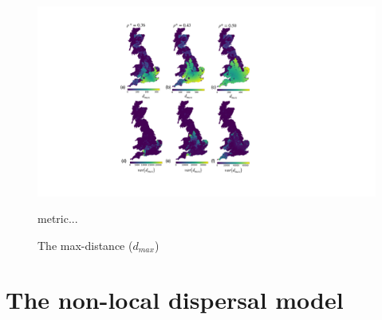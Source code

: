 \begin{figure}
    \centering
    \includegraphics[scale=0.55]{appendix/figures/A-ch4figure1.pdf}
    \caption{The max-distance ($d_{max}$)} metric...
    \label{fig:my_label}
\end{figure}

\blindtext
\blindtext

\chapter{The non-local dispersal model}
\label{section:apendix_A}

